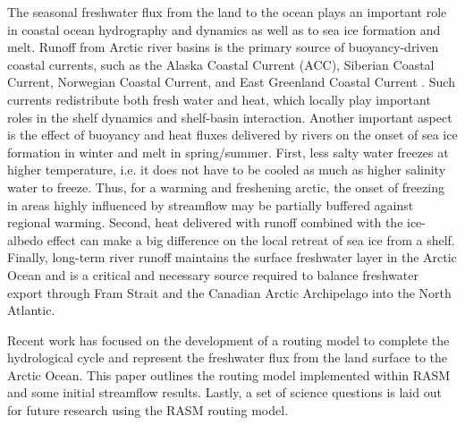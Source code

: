 The seasonal freshwater flux from the land to the ocean plays an important role in coastal ocean hydrography and dynamics as well as to sea ice formation and melt.
Runoff from Arctic river basins is the primary source of buoyancy-driven coastal currents, such as the Alaska Coastal Current (ACC), Siberian Coastal Current, Norwegian Coastal Current, and East Greenland Coastal Current \citep[e.g.]{Serreze_2000,Boyd_2002, McGeehan_2012}.
Such currents redistribute both fresh water and heat, which locally play important roles in the shelf dynamics and shelf-basin interaction. Another important aspect is the effect of buoyancy and heat fluxes delivered by rivers on the onset of sea ice formation in winter and melt in spring/summer.
First, less salty water freezes at higher temperature, i.e. it does not have to be cooled as much as higher salinity water to freeze.
Thus, for a warming and freshening arctic, the onset of freezing in areas highly influenced by streamflow may be partially buffered against regional warming.
Second, heat delivered with runoff combined with the ice-albedo effect can make a big difference on the local retreat of sea ice from a shelf.
Finally, long-term river runoff maintains the surface freshwater layer in the Arctic Ocean and is a critical and necessary source required to balance freshwater export through Fram Strait and the Canadian Arctic Archipelago into the North Atlantic.

Recent work has focused on the development of a routing model to complete the hydrological cycle and represent the freshwater flux from the land surface to the Arctic Ocean.
This paper outlines the routing model implemented within RASM and some initial streamflow results.
Lastly, a set of science questions is laid out for future research using the RASM routing model.

  
  
  
  